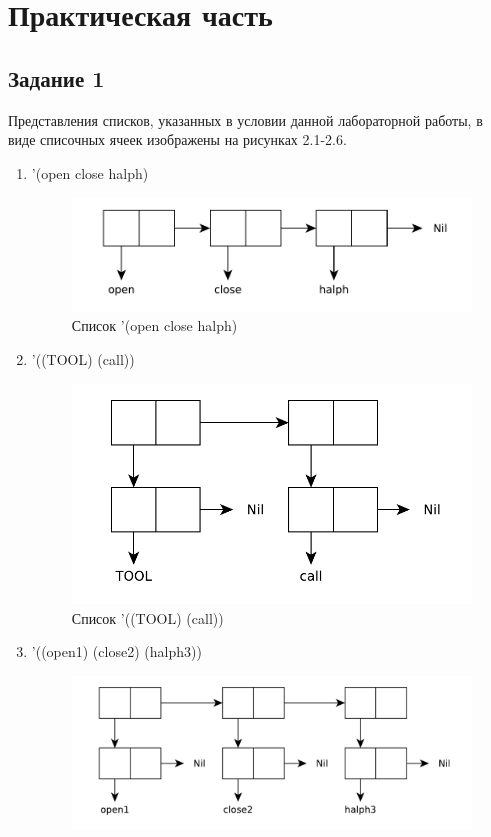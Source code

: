 \chapter{Практическая часть}

\section{Задание \No{}1}
Представления списков, указанных в условии данной лабораторной работы, в виде списочных ячеек изображены на рисунках 2.1-2.6.

\begin{enumerate}
    \item '(open close halph)
        \begin{figure}[H]
            \centering
            \includegraphics[scale=0.60]{data/pdf/01-01.pdf}
            \caption{Список '(open close halph)}
        \end{figure}
    \item '((TOOL) (call))
        \begin{figure}[H]
            \centering
            \includegraphics[scale=0.60]{data/pdf/01-02.pdf}
            \caption{Список '((TOOL) (call))}
        \end{figure}
    \item '((open1) (close2) (halph3))
        \begin{figure}[H]
            \centering
            \includegraphics[scale=0.60]{data/pdf/01-03.pdf}

\end{figure}
\end{enumerate}
